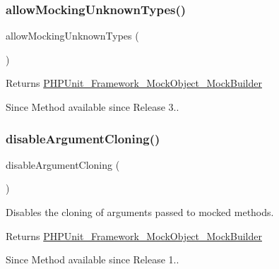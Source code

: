 \subsubsection{\texorpdfstring{allow\+Mocking\+Unknown\+Types()}{allowMockingUnknownTypes()}}
{\footnotesize\ttfamily allow\+Mocking\+Unknown\+Types (\begin{DoxyParamCaption}{ }\end{DoxyParamCaption})}

\begin{DoxyReturn}{Returns}
\mbox{\hyperlink{class_p_h_p_unit___framework___mock_object___mock_builder}{P\+H\+P\+Unit\+\_\+\+Framework\+\_\+\+Mock\+Object\+\_\+\+Mock\+Builder}}
\end{DoxyReturn}
\begin{DoxySince}{Since}
Method available since Release 3.. 
\end{DoxySince}
\mbox{\label{class_p_h_p_unit___framework___mock_object___mock_builder_ad0d2332a31f15a18157ec118935ff6f7}} 
\subsubsection{\texorpdfstring{disable\+Argument\+Cloning()}{disableArgumentCloning()}}
{\footnotesize\ttfamily disable\+Argument\+Cloning (\begin{DoxyParamCaption}{ }\end{DoxyParamCaption})}

Disables the cloning of arguments passed to mocked methods.

\begin{DoxyReturn}{Returns}
\mbox{\hyperlink{class_p_h_p_unit___framework___mock_object___mock_builder}{P\+H\+P\+Unit\+\_\+\+Framework\+\_\+\+Mock\+Object\+\_\+\+Mock\+Builder}}
\end{DoxyReturn}
\begin{DoxySince}{Since}
Method available since Release 1.. 
\end{DoxySince}
\mbox{\label{class_p_h_p_unit___framework___mock_object___mock_builder_a99413480c96935be683033999da633d7}} 
